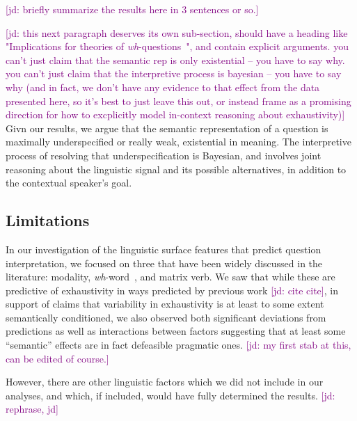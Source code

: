 \documentclass[12pt,letterpaper,table,svgnames,dvipsnames]{article}
\newcommand{\jd}[1]{\textcolor{Purple}{[jd: #1]}}
\newcommand{\whqs}{\emph{wh}-questions~}
\newcommand{\whw}{\emph{wh}-word~}
\begin{document}
\jd{briefly summarize the results here in 3 sentences or so.}

\jd{this next paragraph deserves its own sub-section, should have a heading like "Implications for theories of \whqs", and contain explicit arguments. you can't just claim that the semantic rep is only existential -- you have to say why. you can't just claim that the interpretive process is bayesian -- you have to say why (and in fact, we don't have any evidence to that effect from the data presented here, so it's best to just leave this out, or instead frame as a promising direction for how to excplicitly model in-context reasoning about exhaustivity)}
Givn our results, we argue that the semantic representation of a question is maximally underspecified or really weak, existential in meaning. The interpretive process of resolving that underspecification is Bayesian, and involves joint reasoning about the linguistic signal and its possible alternatives, in addition to the contextual speaker's goal.



\subsection{Limitations}

In our investigation of the linguistic surface features that predict question interpretation, we focused on three  that have been widely discussed in the literature: modality, \whw, and matrix verb. We saw that while these are predictive of exhaustivity in ways predicted by previous work \jd{cite cite}, in support of claims that variability in exhaustivity is at least to some extent semantically conditioned, we also observed both significant deviations from predictions as well as interactions between factors suggesting that at least some ``semantic'' effects are in fact defeasible pragmatic ones. \jd{my first stab at this, can be edited of course.} 

However, there are other linguistic factors which we did not include in our analyses, and which, if included, would have fully determined the results. \jd{rephrase, jd} 
\end{document}
